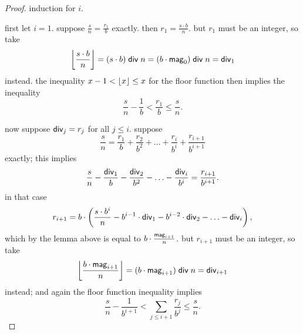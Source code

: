 \documentclass[a4paper, 12pt]{report}
\begin{document}
\begin{proof}
	induction for $i$.

	first let $i = 1$. suppose $\frac{s}{n} = \frac{r_1}{b}$ exactly.
	then $r_1 = \frac{s \cdot b}{n}$. but $r_1$ must be an integer,
	so take
	\begin{equation*}
		  \left\lfloor \frac{s \cdot b}{n} \right\rfloor
		= (s \cdot b) \;\mathsf{div}\; n
		= (b \cdot \mathsf{mag}_0) \;\mathsf{div}\; n
		= \mathsf{div}_1
	\end{equation*}
	instead.
	the inequality $x - 1 < \left\lfloor x \right\rfloor \leq x$ for the floor function then implies the inequality
	\begin{equation*}
		\frac{s}{n} - \frac{1}{b} < \frac{r_1}{b} \leq \frac{s}{n}.
	\end{equation*} \bigskip

	now suppose $\mathsf{div}_j = r_j$ for all $j \leq i$. suppose
	\begin{equation*}
		  \frac{s}{n}
		= \frac{r_1}{b}
		+ \frac{r_2}{b^2}
		+ \ldots
		+ \frac{r_i}{b^i}
		+ \frac{r_{i + 1}}{b^{i + 1}}
	\end{equation*}
	exactly; this implies
	\begin{equation*}
		  \frac{s}{n}
		- \frac{\mathsf{div}_1}{b}
		- \frac{\mathsf{div}_2}{b^2}
		- \ldots
		- \frac{\mathsf{div}_i}{b^i}
		= \frac{r_{i + 1}}{b^{i + 1}}.
	\end{equation*}
	in that case
	\begin{equation*}
		  r_{i + 1}
		= b \cdot \left(
		  \frac{s \cdot b^i}{n}
		- b^{i - 1} \cdot \mathsf{div}_1
		- b^{i - 2} \cdot \mathsf{div}_2
		- \ldots
		- \mathsf{div}_i
		\right),
	\end{equation*}
	which by the lemma above is equal to $b \cdot \frac{\mathsf{mag}_{i + 1}}{n}$.
	but $r_{i + 1}$ must be an integer,
	so take
	\begin{equation*}
		  \left\lfloor \frac{b \cdot \mathsf{mag}_{i + 1}}{n} \right\rfloor
		= (b \cdot \mathsf{mag}_{i + 1}) \;\mathsf{div}\; n
		= \mathsf{div}_{i + 1}
	\end{equation*}
	instead; and again the floor function inequality implies
	\begin{equation*}
		\frac{s}{n} - \frac{1}{b^{i + 1}} < \sum_{j \leq i + 1} \frac{r_j}{b^j} \leq \frac{s}{n}.
	\end{equation*}
\end{proof}
\end{document}
